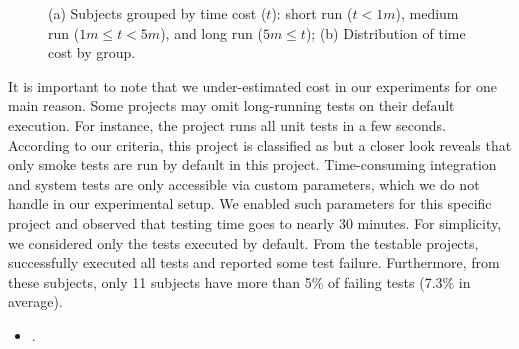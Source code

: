 \begin{figure}[ht]
\begin{subfigure}{0.25\textwidth}
    \caption{\label{fig:rq1-boxplot}}
  \end{subfigure}%
  \caption{(a) Subjects grouped by time cost ($t$): short run ($t <
  1m$), medium run ($1m \le t < 5m$), and long run ($5m \le t$); (b)
  Distribution of time cost by group.}
  \vspace{-3ex}
\end{figure}

It is important to note that we under-estimated cost in our
experiments for one main reason.
Some projects may omit long-running tests on their default
execution. For instance, the project 
runs all unit tests in a few seconds.  According to our criteria, this
project is classified as \shortg{} but a closer look reveals
that only smoke tests are run by default in this project.
Time-consuming integration and system tests are only accessible via
custom parameters, which we do not handle in our experimental setup.
We enabled such parameters for this specific project and observed that
testing time goes to nearly 30 minutes.  For simplicity, we considered
only the tests executed by default.
From the \numSubjs{} testable projects, \numSubjsPass{} successfully
executed all tests and \numSubjsFail{} reported some test failure.
Furthermore, from these \numSubjsFail{} subjects, only 11 subjects
have more than 5\% of failing tests (7.3\% in average).
\begin{center}
\vspace{1ex}
\vspace{1ex}
\end{center}

\begin{itemize}
  \item \numRQFeasibilityTwo. \textbf{\RQFeasibilityTwo}
\end{itemize}

